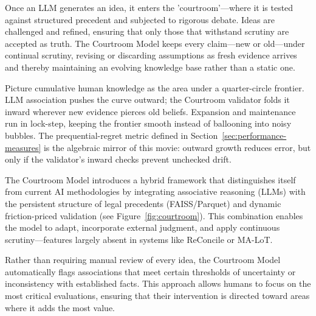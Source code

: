 \documentclass[11pt]{article}
\begin{document}
Once an LLM generates an idea, it enters the 'courtroom'—where it is tested against structured precedent and subjected to rigorous debate. Ideas are challenged and refined, ensuring that only those that withstand scrutiny are accepted as truth. The Courtroom Model keeps every claim—new or old—under continual scrutiny, revising or discarding assumptions as fresh evidence arrives and thereby maintaining an evolving knowledge base rather than a static one.

Picture cumulative human knowledge as the area under a quarter-circle frontier. LLM association pushes the curve outward; the Courtroom validator folds it inward wherever new evidence pierces old beliefs. Expansion and maintenance run in lock-step, keeping the frontier smooth instead of ballooning into noisy bubbles. The prequential-regret metric defined in Section~\ref{sec:performance-measures} is the algebraic mirror of this movie: outward growth reduces error, but only if the validator's inward checks prevent unchecked drift.

The Courtroom Model introduces a hybrid framework that distinguishes itself from current AI methodologies by integrating associative reasoning (LLMs) with the persistent structure of legal precedents (FAISS/Parquet) and dynamic friction-priced validation (see Figure~\ref{fig:courtroom}).
This combination enables the model to adapt, incorporate external judgment, and apply continuous scrutiny—features largely absent in systems like ReConcile or MA-LoT.

Rather than requiring manual review of every idea, the Courtroom Model automatically flags associations that meet certain thresholds of uncertainty or inconsistency with established facts. This approach allows humans to focus on the most critical evaluations, ensuring that their intervention is directed toward areas where it adds the most value.
\end{document}
